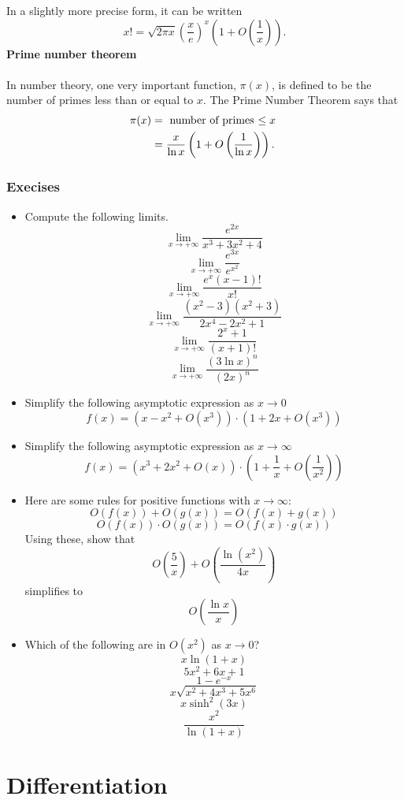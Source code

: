 \documentclass[a4paper]{book}
\begin{document}
\begin{sloppypar}
In a slightly more precise form, it can be written \[ x! = \sqrt{2\pi x} \left(\frac{x}{e}\right)^x \left(1+O\left(\frac{1}{x}\right)\right). \]
\bigbreak
\noindent \textbf{Prime number theorem}\\\\
In number theory, one very important function, $\pi(x)$, is defined to be the number of primes less than or equal to $x$. The Prime Number Theorem says that
\begin{align*}
\pi(x) &= \hbox{ number of primes $\leq x$ } \\
&= \frac{x}{\ln x} \left(1 + O\left(\frac{1}{\ln x}\right)\right).
\end{align*}

\subsection{Execises}
\begin{itemize}
\item Compute the following limits.
\[\displaystyle \lim_{x \to +\infty} \frac{e^{2x}}{x^3 + 3x^2 +4}\]
\[\displaystyle \lim_{x \rightarrow +\infty} \frac{e^{3x}}{e^{x^2}}\]
\[\displaystyle \lim_{x \rightarrow +\infty} \frac {e^x (x-1)!}{x!}\]
\[\displaystyle \lim_{x \rightarrow +\infty} \frac {(x^2-3)(x^2+3)}{2x^4-2x^2+1}\]
\[\displaystyle \lim_{x \to +\infty} \frac{2^x + 1}{(x+1)!}\]
\[\displaystyle \lim_{x \to +\infty} \frac{(3 \ln x)^n}{(2x)^n}\]
\item Simplify the following asymptotic expression as $x\to 0$ \[ f(x) = \left( x - x^2 + O(x^3)\right)\cdot\left(1+2x + O(x^3)\right) \]
\item Simplify the following asymptotic expression as $x\to \infty$ \[ f(x) =\left( x^3 + 2x^2 + O(x)\right)\cdot\left(1+\frac{1}{x}+O\left(\frac{1}{x^2}\right)\right) \]
\item Here are some rules for positive functions with $x\to\infty$: \[ O(f(x)) + O(g(x)) = O(f(x) + g(x)) \] \[ O(f(x))\cdot O(g(x)) = O(f(x)\cdot g(x))\]
Using these, show that \[ O\left(\frac{5}{x}\right) + O\left(\frac{\ln(x^2)}{4x}\right) \] simplifies to \[ \displaystyle O\left(\frac{\ln x}{x}\right) \]
\item Which of the following are in $O(x^2)$ as $x \to 0 $? \[x \ln(1+x) \] \[ 5x^2+6x+1 \] \[1-e^{-x} \] \[ x \sqrt{x^2+4x^3+5x^6} \] \[x \sinh^2(3x) \] \[\frac{x^2}{\ln(1+x)} \]
\end{itemize}

\chapter{Differentiation} \label{ChDifferentiation}

\end{sloppypar}
\end{document}
